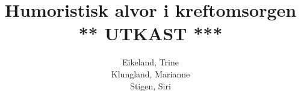 \documentclass[a4paper,norsk,12pt,twoside]{report}
\begin{document}
  \author{
    Eikeland, Trine\\
    Klungland, Marianne\\
    Stigen, Siri\\
  }
  \title{Humoristisk alvor i kreftomsorgen \\
    {\Huge{\sffamily *** UTKAST ***}}}

  \maketitle
  

  \tableofcontents

  \clearpage

  
  \clearpage

  \begingroup %
  \raggedright %
  \nocite{*} %
  
  \endgroup %

  \appendix
  
  \clearpage %
  \printindex
\end{document}
